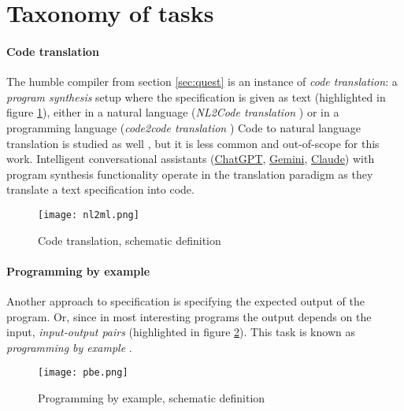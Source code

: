 
\newpage
\section{Taxonomy of tasks}
\label{sec:ps-task-taxonomy}

\paragraph{Code translation}

The humble compiler from section \ref{sec:quest} is an instance of \emph{code translation}: a \emph{program synthesis} setup where the specification is given as text (highlighted in figure \ref{fig:nl2ml}), either in a natural language (\emph{NL2Code translation} \cite{wangNaturalLanguageCode2023, zanLargeLanguageModels2023}) or in a programming language (\emph{code2code translation} \cite{radfordImprovingLanguageUnderstanding})
Code to natural language translation is studied as well \cite[section 5.1]{leDeepLearningSource2020}, but it is less common and out-of-scope for this work.
Intelligent conversational assistants (\href{https://chat.openai.com/}{ChatGPT}, \href{https://gemini.google.com}{Gemini}, \href{https://claude.ai/}{Claude}) with program synthesis functionality operate in the translation paradigm as they translate a text specification into code.

\begin{figure}
    \centering
    \texttt{[image: nl2ml.png]}
    \caption{Code translation, schematic definition}
    \label{fig:nl2ml}
\end{figure}

\paragraph{Programming by example}

Another approach to specification is specifying the expected output of the program. Or, since in most interesting programs the output depends on the input, \emph{input-output pairs} (highlighted in figure \ref{fig:pbe}). This task is known as \emph{programming by example} \cite{halbertProgrammingExample1984, psb2}.

\begin{figure}
    \centering
    \texttt{[image: pbe.png]}
    \caption{Programming by example, schematic definition}
    \label{fig:pbe}
\end{figure}

